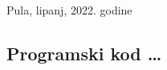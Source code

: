 \documentclass[11pt,a4paper]{report}
\begin{document}
\begin{center}
Pula, lipanj, 2022. godine
\end{center}

\setcounter{page}{1}





\tableofcontents
\newpage








\nocite{*}

\listoffigures
{}

\newpage

\appendix
\begin{appendices}\appendix
\chapter{Programski kod \ldots}\label{addendumA}
\end{appendices}
\end{document}

